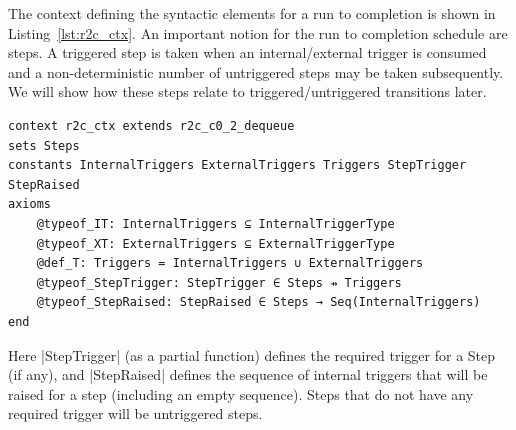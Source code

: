 The context defining the syntactic elements for a run to completion is shown in Listing~\ref{lst:r2c_ctx}. 
An important notion for the run to completion schedule are steps.  
A triggered  step is taken when an internal/external trigger is consumed and a non-deterministic number of untriggered steps may be taken subsequently. 
We will show how these steps relate to triggered/untriggered transitions later.  

\begin{lstlisting}[language=Event-B, caption = {Context for Run-to-Completion Semantics}, label = {lst:r2c_ctx}]
context r2c_ctx extends r2c_c0_2_dequeue 
sets Steps
constants InternalTriggers ExternalTriggers Triggers StepTrigger StepRaised
axioms
	@typeof_IT: InternalTriggers ⊆ InternalTriggerType
	@typeof_XT: ExternalTriggers ⊆ ExternalTriggerType
	@def_T: Triggers = InternalTriggers ∪ ExternalTriggers
	@typeof_StepTrigger: StepTrigger ∈ Steps ⇸ Triggers
	@typeof_StepRaised: StepRaised ∈ Steps → Seq(InternalTriggers)
end
\end{lstlisting} 
Here |StepTrigger| (as a partial function) defines the required trigger for a Step (if any), and |StepRaised| defines the sequence of internal triggers that will be raised for a step (including an empty sequence). Steps that do not have any required trigger will be untriggered steps.


